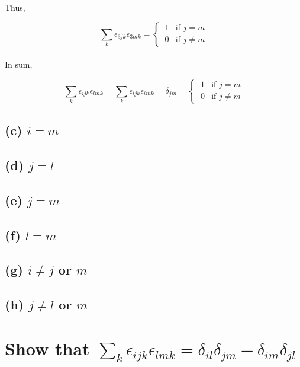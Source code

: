 \documentclass[a4paper]{article}
\begin{document}
Thus, 

\begin{equation*}
	\sum_k \epsilon_{3jk}\epsilon_{3mk} = 
	\begin{cases}
	  	\ 1 & \text{if } j = m \\
	    \ 0 & \text{if } j \neq m
	  \end{cases}
\end{equation*}
\\

In sum,

\begin{equation*}
	\sum_k \epsilon_{ijk}\epsilon_{lmk} = \sum_k \epsilon_{ijk}\epsilon_{imk} = \delta_{jm} =
	\begin{cases}
	  	\ 1 & \text{if } j = m \\
	    \ 0 & \text{if } j \neq m
	  \end{cases}
\end{equation*}


\subsection*{(c) $i = m$}

\subsection*{(d) $j = l$}

\subsection*{(e) $j = m$}

\subsection*{(f) $l = m$}

\subsection*{(g) $i \neq j$ or $m$}

\subsection*{(h) $j \neq l$ or $m$}


\section{Show that $\sum\limits_k \epsilon_{ijk}\epsilon_{lmk} = \delta_{il}\delta_{jm} - \delta_{im}\delta_{jl}$}
\end{document}
